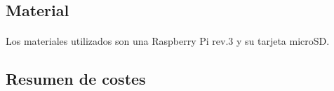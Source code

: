 \subsection{Material}

\paragraph{}Los materiales utilizados son una Raspberry Pi rev.3 y su tarjeta microSD.

\subsection{Resumen de costes}


